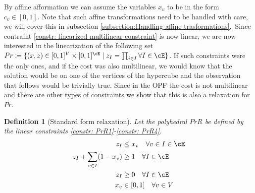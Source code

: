 \documentclass{article}
\newcommand{\gr}[2][]{\todo[color=green!20,#1]{\textsf{G:} #2}}
\newtheorem{definition}{Definition}
\begin{document}
	By affine afformation we can assume the variables \(x_v\) to be in the form \(c_v \in [0,1]\). Note that such affine transformations need to be handled with care, we will cover this in subsection \ref{subsection:Handling affine trasformations}.\
	Since contraint \eqref{constr: linearized multilinear constraint} is now linear, we are now interested in the linearization of the following set \(Pr \coloneqq  \{(x,z) \in [0,1]^V \times [0,1]^{\cE} \mid z_I = \prod_{i \in I} \forall I \in \cE\}\).
	If such constraints were the only ones, and if the cost was also multilinear, we would know that the solution would be on one of the vertices of the hypercube and the observation that follows would be trivially true. Since in the OPF the cost is not multilinear and there are other types of constraints we show that this is also a relaxation for \(Pr\).
	\begin{definition}[Standard form relaxation]\label{def: standard form relaxation}
		Let the polyhedral \(PrR\) be defined by the linear constraints  \eqref{constr: PrR1}-\eqref{constr: PrR4}.
		\gr[]{fixalignment}
		\begin{align}
			z_I &\leq x_v   \quad\forall v \in I \in \cE \label{constr: PrR1} \\
			z_I + \sum_{v \in I}(1-x_v) &\geq 1 \quad \forall I \in \cE \label{constr: PrR2}\\
			z_I &\geq 0  \quad\forall I \in \cE \label{constr: PrR3}\\
			x_v &\in [0,1]  \quad \forall v \in V \label{constr: PrR4}
		\end{align}
	\end{definition}
\end{document}

